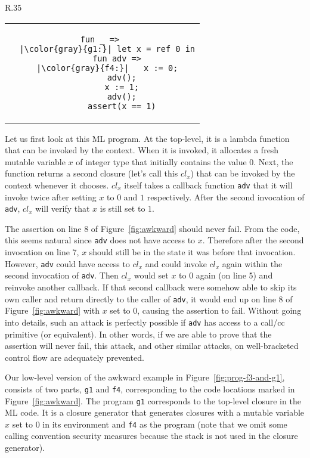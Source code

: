 \documentclass[format=acmsmall, review=true, screen=true]{acmart}
\begin{document}
\begin{wrapfigure}{R}{.35\textwidth}
  \centering
  \begin{tabular}{c} %
  \begin{lstlisting}[gobble=2,escapeinside=||,keywords={fun, let, in, ref, assert}]
  fun _ => 
  |\color{gray}{g1:}| let x = ref 0 in
      fun adv =>
  |\color{gray}{f4:}|   x := 0;
        adv();
        x := 1;
        adv();
        assert(x == 1)
  \end{lstlisting}
  \end{tabular}
  \caption{The original awkward example from \citet{pitts_operational_1998,Dreyer:jfp12}, in ML notation.}
  \label{fig:awkward}
\end{wrapfigure}

Let us first look at this ML program.
At the top-level, it is a lambda function that can be invoked by the context.
When it is invoked, it allocates a fresh mutable variable $x$ of integer type that initially contains the value $0$.
Next, the function returns a second closure (let's call this $\textit{cl}_x$) that can be invoked by the context whenever it chooses.
$\textit{cl}_x$ itself takes a callback function \texttt{adv} that it will invoke twice after setting $x$ to $0$ and $1$ respectively.
After the second invocation of \texttt{adv}, $\textit{cl}_x$ will verify that $x$ is still set to $1$.

The assertion on line 8 of Figure~\ref{fig:awkward} should never fail.
From the code, this seems natural since \texttt{adv} does not have access to $x$.
Therefore after the second invocation on line 7, $x$ should still be in the state it was before that invocation.
However, \texttt{adv} could have access to $\textit{cl}_x$ and could invoke $\textit{cl}_x$ again within the second invocation of \texttt{adv}.
Then $\textit{cl}_x$ would set $x$ to $0$ again (on line 5) and reinvoke another callback.
If that second callback were somehow able to skip its own caller and return directly to the caller of \texttt{adv}, it would end up on line 8 of Figure~\ref{fig:awkward} with $x$ set to $0$, causing the assertion to fail.
Without going into details, such an attack is perfectly possible if \texttt{adv} has access to a call/cc primitive (or equivalent).
In other words, if we are able to prove that the assertion will never fail, this attack, and other similar attacks, on well-bracketed control flow are adequately prevented.

Our low-level version of the awkward example in Figure~\ref{fig:prog-f3-and-g1}, consists of two parts, \texttt{g1} and \texttt{f4}, corresponding to the code locations marked in Figure~\ref{fig:awkward}.
The program \texttt{g1} corresponds to the top-level closure in the ML code.
It is a closure generator that generates closures with a mutable variable $x$ set to $0$ in its environment and \texttt{f4} as the program (note that we omit some calling convention security measures because the stack is not used in the closure generator).
\end{document}
